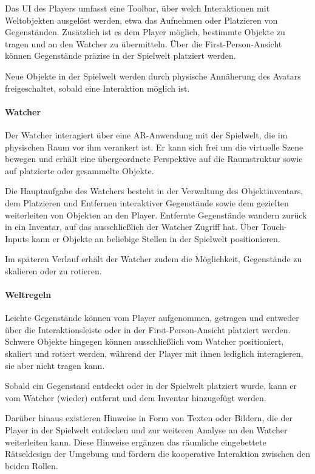 Das \ac{UI} des Players umfasst eine Toolbar, über welch Interaktionen mit Weltobjekten ausgelöst werden, etwa das Aufnehmen oder Platzieren von Gegenständen. Zusätzlich ist es dem Player möglich, bestimmte Objekte zu tragen und an den Watcher zu übermitteln. Über die First-Person-Ansicht können Gegenstände präzise in der Spielwelt platziert werden.

Neue Objekte in der Spielwelt werden durch physische Annäherung des Avatars freigeschaltet, sobald eine Interaktion möglich ist.

\paragraph{Watcher}

Der Watcher interagiert über eine \ac{AR}-Anwendung mit der Spielwelt, die im physischen Raum vor ihm verankert ist. Er kann sich frei um die virtuelle Szene bewegen und erhält eine übergeordnete Perspektive auf die Raumstruktur sowie auf platzierte oder gesammelte Objekte.

Die Hauptaufgabe des Watchers besteht in der Verwaltung des Objektinventars, dem Platzieren und Entfernen interaktiver Gegenstände sowie dem gezielten weiterleiten von Objekten an den Player. Entfernte Gegenstände wandern zurück in ein Inventar, auf das ausschließlich der Watcher Zugriff hat. Über Touch-Inputs kann er Objekte an beliebige Stellen in der Spielwelt positionieren.

Im späteren Verlauf erhält der Watcher zudem die Möglichkeit, Gegenstände zu skalieren oder zu rotieren.

\paragraph{Weltregeln}

Leichte Gegenstände können vom Player aufgenommen, getragen und entweder über die Interaktionsleiste oder in der First-Person-Ansicht platziert werden. Schwere Objekte hingegen können ausschließlich vom Watcher positioniert, skaliert und rotiert werden, während der Player mit ihnen lediglich interagieren, sie aber nicht tragen kann. 

Sobald ein Gegenstand entdeckt oder in der Spielwelt platziert wurde, kann er vom Watcher (wieder) entfernt und dem Inventar hinzugefügt werden.

Darüber hinaus existieren Hinweise in Form von Texten oder Bildern, die der Player in der Spielwelt entdecken und zur weiteren Analyse an den Watcher weiterleiten kann. Diese Hinweise ergänzen das räumliche eingebettete Rätseldesign der Umgebung und fördern die kooperative Interaktion zwischen den beiden Rollen.

